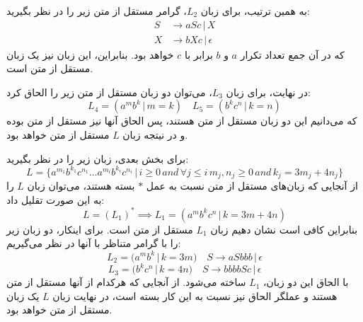 به همین ترتیب، برای زبان $L_2$، گرامر مستقل از متن زیر را در نظر بگیرید:
\begin{align*}
	S &\to a S c \,|\, X \\
	X &\to b X c \,|\, \epsilon
\end{align*}
که در آن جمع تعداد تکرار $a$ و $b$ برابر با $c$ خواهد بود. بنابراین، این زبان نیز یک زبان مستقل از متن است.

در نهایت، برای زبان $L_3$، می‌توان دو زبان مستقل از متن زیر را الحاق کرد:
\[
L_4 = (a^m b^k \,|\, m = k) \quad
L_5 = (b^k c^n \,|\, k = n)     
\]
که می‌دانیم این دو زبان مستقل از متن هستند، پس الحاق آنها نیز مستقل از متن بوده و در نیتجه زبان $L$ مستقل از متن خواهد بود.

برای بخش بعدی، زبان زیر را در نظر بگیرید:
\[
L = \{a^{m_1} b^{k_1} c^{n_1} \dots a^{m_i} b^{k_i} c^{n_i} \,|\, i \geq 0 \,and\, \forall j \leq i \, m_j, n_j \geq 0 \,and\, k_j = 3m_j + 4n_j\}    
\]
از آنجایی که زبان‌های مستقل از متن نسبت به عمل $*$ بسته هستند، می‌توان زبان $L$ را به این صورت تقلیل داد:
\[
L = (L_1)^{*} \implies L_1 = (a^m b^k c^n \,|\, k = 3m + 4n)    
\]
بنابراین کافی است نشان دهیم زبان $L_1$ مستقل از متن است. برای اینکار، دو زبان زیر را با گرامر متناظر با آنها در نظر می‌گیریم:
\[
L_2 = (a^m b^k \,|\, k = 3m) \quad S \to aSbbb \,|\, \epsilon    
\]
\[
L_3= (b^k c^n \,|\, k = 4n) \quad S \to bbbbSc \,|\, \epsilon    
\]
با الحاق این دو زبان، $L_1$ ساخته می‌شود. از آنجایی که هرکدام از آنها مستقل از متن هستند و عملگر الحاق نیز نسبت به این کار بسته است، در نهایت زبان $L$ یک زبان مستقل از متن خواهد بود.
